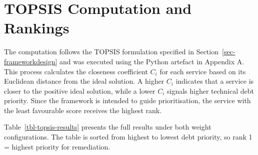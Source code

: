 \documentclass[
  12pt,
  letterpaper,
  12pt,
  oneside,
  english,
  onehalfspacing,
  headsepline]{MastersDoctoralThesis}
\begin{document}
\section{TOPSIS Computation and Rankings}\label{sec-topsis-results}

The computation follows the TOPSIS formulation specified in
Section~\ref{sec-frameworkdesign} and was executed using the Python
artefact in Appendix A. This process calculates the closeness
coefficient \(C_i\) for each service based on its Euclidean distance
from the ideal solution. A higher \(C_i\) indicates that a service is
closer to the positive ideal solution, while a lower \(C_i\) signals
higher technical debt priority. Since the framework is intended to guide
prioritisation, the service with the least favourable score receives the
highest rank.

Table~\ref{tbl-topsis-results} presents the full results under both
weight configurations. The table is sorted from highest to lowest debt
priority, so rank 1 = highest priority for remediation.
\end{document}
